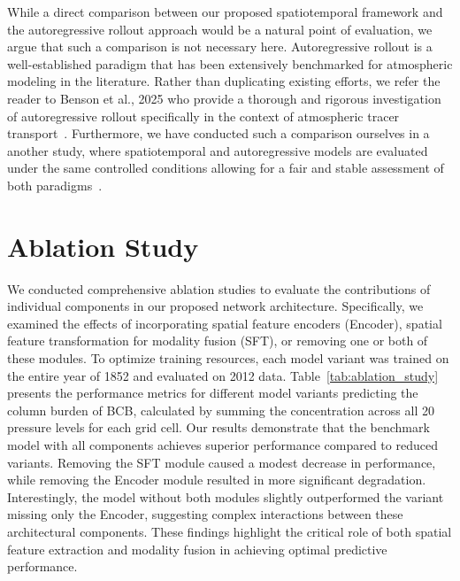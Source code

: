 \documentclass[11pt]{article}
\begin{document}
    While a direct comparison between our proposed spatiotemporal framework and the autoregressive rollout approach would be a natural point of evaluation, we argue that such a comparison is not necessary here. Autoregressive rollout is a well-established paradigm that has been extensively benchmarked for atmospheric modeling in the literature. Rather than duplicating existing efforts, we refer the reader to Benson et al., 2025 who provide a thorough and rigorous investigation of autoregressive rollout specifically in the context of atmospheric tracer transport~\cite{benson2025atmospheric}. Furthermore, we have conducted such a comparison ourselves in a another study, where spatiotemporal and autoregressive models are evaluated under the same controlled conditions allowing for a fair and stable assessment of both paradigms~\cite{erfani2026spatiotemporal}.

\section{Ablation Study}
    We conducted comprehensive ablation studies to evaluate the contributions of individual components in our proposed network architecture. Specifically, we examined the effects of incorporating spatial feature encoders (Encoder), spatial feature transformation for modality fusion (SFT), or removing one or both of these modules. To optimize training resources, each model variant was trained on the entire year of 1852 and evaluated on 2012 data. Table~\ref{tab:ablation_study} presents the performance metrics for different model variants predicting the column burden of BCB, calculated by summing the concentration across all 20 pressure levels for each grid cell. Our results demonstrate that the benchmark model with all components achieves superior performance compared to reduced variants. Removing the SFT module caused a modest decrease in performance, while removing the Encoder module resulted in more significant degradation. Interestingly, the model without both modules slightly outperformed the variant missing only the Encoder, suggesting complex interactions between these architectural components. These findings highlight the critical role of both spatial feature extraction and modality fusion in achieving optimal predictive performance.
\end{document}
